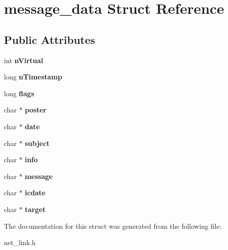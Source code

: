 \hypertarget{structmessage__data}{\section{message\-\_\-data Struct Reference}
\label{structmessage__data}
}
\subsection*{Public Attributes}
\begin{DoxyCompactItemize}
\item 
\hypertarget{structmessage__data_af515291944b6a6bca2691f17011a4912}{int {\bfseries n\-Virtual}}\label{structmessage__data_af515291944b6a6bca2691f17011a4912}

\item 
\hypertarget{structmessage__data_a309b3b979bba01f3d1ed02c748181b89}{long {\bfseries n\-Timestamp}}\label{structmessage__data_a309b3b979bba01f3d1ed02c748181b89}

\item 
\hypertarget{structmessage__data_af7cf3761d12c356ef956a6310d238796}{long {\bfseries flags}}\label{structmessage__data_af7cf3761d12c356ef956a6310d238796}

\item 
\hypertarget{structmessage__data_a8e32e1ef2badc1155fe33c86a7a589b9}{char $\ast$ {\bfseries poster}}\label{structmessage__data_a8e32e1ef2badc1155fe33c86a7a589b9}

\item 
\hypertarget{structmessage__data_a6ab4c9b9a0f22a2bdabd8f9cfac312ad}{char $\ast$ {\bfseries date}}\label{structmessage__data_a6ab4c9b9a0f22a2bdabd8f9cfac312ad}

\item 
\hypertarget{structmessage__data_a69def671138afb7572f9a67d8c32a8d9}{char $\ast$ {\bfseries subject}}\label{structmessage__data_a69def671138afb7572f9a67d8c32a8d9}

\item 
\hypertarget{structmessage__data_af31540c3a3a2deea7204404d96514edd}{char $\ast$ {\bfseries info}}\label{structmessage__data_af31540c3a3a2deea7204404d96514edd}

\item 
\hypertarget{structmessage__data_a053ca95bb66adde61826498e8330fc9c}{char $\ast$ {\bfseries message}}\label{structmessage__data_a053ca95bb66adde61826498e8330fc9c}

\item 
\hypertarget{structmessage__data_af68425ba43f8e70ee0c6fecb750154de}{char $\ast$ {\bfseries icdate}}\label{structmessage__data_af68425ba43f8e70ee0c6fecb750154de}

\item 
\hypertarget{structmessage__data_a8b1ac3a31472876aa85ec7dd759ba98e}{char $\ast$ {\bfseries target}}\label{structmessage__data_a8b1ac3a31472876aa85ec7dd759ba98e}

\end{DoxyCompactItemize}


The documentation for this struct was generated from the following file\-:\begin{DoxyCompactItemize}
\item 
net\-\_\-link.\-h\end{DoxyCompactItemize}
